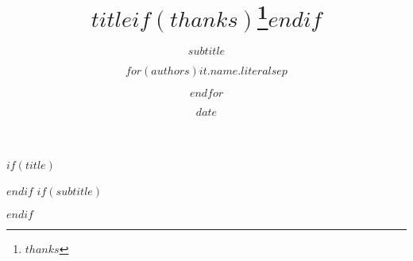 $if(title)$
\title{$title$$if(thanks)$\thanks{$thanks$}$endif$}
$endif$
$if(subtitle)$
\subtitle{$subtitle$}
$endif$
\author{$for(authors)$$it.name.literal$$sep$ \and $endfor$}
\date{$date$}



